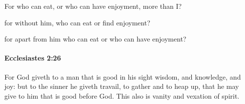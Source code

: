 			\begin{versebox}
					\item[BHS] 
					\item[LXX] 
					\item[ASV] For who can eat, or who can have enjoyment, more than I?
					\item[NIV] for without him, who can eat or find enjoyment?
					\item[NRSV] for apart from him who can eat or who can have enjoyment?
			\end{versebox}

		\paragraph{Ecclesiastes 2:26} %
			\label{ECCLESIASTES-2-26}

			For God giveth to a man that is good in his sight wisdom, and knowledge, and joy: but to the sinner he giveth travail, to gather and to heap up, that he may give to him that is good before God. This also is vanity and vexation of spirit.

